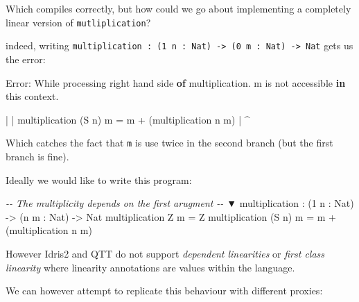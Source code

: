 \documentclass[
]{article}
\newenvironment{Shaded}{}{}
\newcommand{\CommentTok}[1]{\textcolor[rgb]{0.38,0.63,0.69}{\textit{#1}}}
\newcommand{\DataTypeTok}[1]{\textcolor[rgb]{0.56,0.13,0.00}{#1}}
\newcommand{\DecValTok}[1]{\textcolor[rgb]{0.25,0.63,0.44}{#1}}
\newcommand{\FunctionTok}[1]{\textcolor[rgb]{0.02,0.16,0.49}{#1}}
\newcommand{\KeywordTok}[1]{\textcolor[rgb]{0.00,0.44,0.13}{\textbf{#1}}}
\newcommand{\NormalTok}[1]{#1}
\newcommand{\OperatorTok}[1]{\textcolor[rgb]{0.40,0.40,0.40}{#1}}
\newcommand{\OtherTok}[1]{\textcolor[rgb]{0.00,0.44,0.13}{#1}}
\begin{document}
Which compiles correctly, but how could we go about implementing a
completely linear version of \texttt{mutliplication}?

indeed, writing
\texttt{multiplication\ :\ (1\ n\ :\ Nat)\ -\textgreater{}\ (0\ m\ :\ Nat)\ -\textgreater{}\ Nat}
gets us the error:

\begin{Shaded}
\begin{Highlighting}[]
\DataTypeTok{Error}\OperatorTok{:} \DataTypeTok{While}\NormalTok{ processing right hand side }\KeywordTok{of}\NormalTok{ multiplication}\OperatorTok{.} 
\NormalTok{    m is }\FunctionTok{not}\NormalTok{ accessible }\KeywordTok{in}\NormalTok{ this context}\OperatorTok{.}

    \OperatorTok{|}
    \OperatorTok{|}\NormalTok{ multiplication (}\DataTypeTok{S}\NormalTok{ n) m }\OtherTok{=}\NormalTok{ m }\OperatorTok{+}\NormalTok{ (multiplication n m)}
    \OperatorTok{|}                          \OperatorTok{\^{}}
\end{Highlighting}
\end{Shaded}

Which catches the fact that \texttt{m} is use twice in the second branch
(but the first branch is fine).

Ideally we would like to write this program:

\begin{Shaded}
\begin{Highlighting}[]
\CommentTok{{-}{-}        The multiplicity depends on the first arugment}
\CommentTok{{-}{-}                               ▼}
\NormalTok{multiplication }\OperatorTok{:}\NormalTok{ (}\DecValTok{1}\NormalTok{ n }\OperatorTok{:} \DataTypeTok{Nat}\NormalTok{) }\OtherTok{{-}\textgreater{}}\NormalTok{ (n m }\OperatorTok{:} \DataTypeTok{Nat}\NormalTok{) }\OtherTok{{-}\textgreater{}} \DataTypeTok{Nat}
\NormalTok{multiplication }\DataTypeTok{Z}\NormalTok{ m }\OtherTok{=} \DataTypeTok{Z}
\NormalTok{multiplication (}\DataTypeTok{S}\NormalTok{ n) m }\OtherTok{=}\NormalTok{ m }\OperatorTok{+}\NormalTok{ (multiplication n m)}
\end{Highlighting}
\end{Shaded}

However Idris2 and QTT do not support \emph{dependent linearities} or
\emph{first class linearity} where linearity annotations are values
within the language.

We can however attempt to replicate this behaviour with different
proxies:
\end{document}
